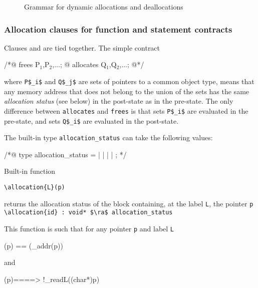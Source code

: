 \begin{figure}[htp]
  \begin{cadre}
      
    \end{cadre}
  \caption{Grammar for dynamic allocations and deallocations}
\label{fig:gram:allocation}
\end{figure}

\subsubsection{Allocation clauses for function and statement contracts}
\label{subsec:allocation-contract}

Clauses \allocates and \frees are tied together. The simple contract
\begin{listing-nonumber}
/*@ frees P$_1$,P$_2$,$\dots$;
  @ allocates Q$_1$,Q$_2$,$\dots$;
  @*/
\end{listing-nonumber}
where \lstinline|P$_i$| and \lstinline|Q$_j$| are sets of pointers to
a common object type,
means that any memory address that does not belong to the union of the sets
has the same {\sl allocation status}
(see below) in the post-state as in the pre-state. The only difference
between \lstinline|allocates| and \lstinline|frees| is that sets
\lstinline|P$_i$| are evaluated
in the pre-state, and sets \lstinline|Q$_i$| are evaluated in the post-state.

The built-in type \lstinline|allocation_status|
can take the following values:
\begin{notimplementedenv}
\begin{listing-nonumber}
/*@
type allocation_status =
    \static | \register | \automatic | \dynamic | \unallocated;
*/
\end{listing-nonumber}
\end{notimplementedenv}

Built-in function
\begin{notimplementedenv}\lstinline|\allocation{L}(p)|\end{notimplementedenv}%
returns the allocation status of the block containing, at the label
\lstinline|L|, the pointer \lstinline|p|
\\ \makebox[5mm]{} \lstinline|\allocation{id} : void* $\ra$ allocation_status|

This function is such that for any pointer \lstinline|p| and label \lstinline|L|
\begin{listing-nonumber}
(p) == (\base_addr(p))
\end{listing-nonumber}
and
\begin{listing-nonumber}
(p)==\unallocated ==> !\valid_read{L}((char*)p)
\end{listing-nonumber}

